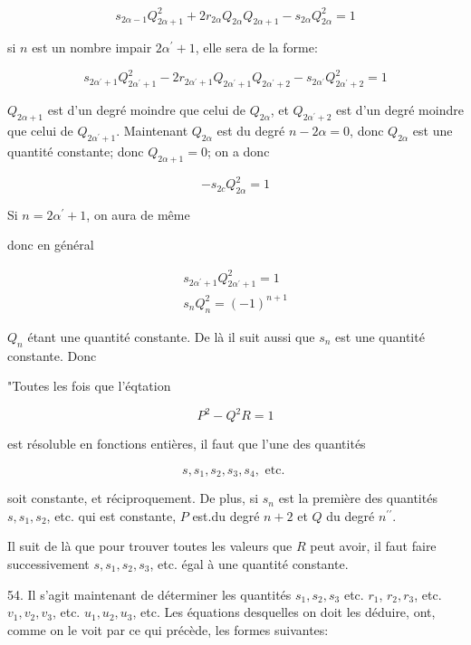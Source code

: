\documentclass{article}
\begin{document}
\[
s_{2 \alpha-1} Q_{2 \alpha+1}^{2}+2 r_{2 \alpha} Q_{2 \alpha} Q_{2 \alpha+1}-s_{2 \alpha} Q_{2 \alpha}^{2}=1
\]

si \(n\) est un nombre impair \(2 \alpha^{\prime}+1\), elle sera de la forme:

\[
s_{2 \alpha^{\prime}+1} Q_{2 \alpha^{\prime}+1}^{2}-2 r_{2 \alpha^{\prime}+1} Q_{2 \alpha^{\prime}+1} Q_{2 \alpha^{\prime}+2}-s_{2 \alpha^{\prime}} Q_{2 \alpha^{\prime}+2}^{2}=1
\]

\(Q_{2 \alpha+1}\) est d'un degré moindre que celui de \(Q_{2 \alpha}\), et \(Q_{2 \alpha^{\prime}+2}\) est d'un degré moindre que celui de \(Q_{2 \alpha^{\prime}+1}\). Maintenant \(Q_{2 \alpha}\) est du degré \(n-2 \alpha=0\), donc \(Q_{2 \alpha}\) est une quantité constante; donc \(Q_{2 \alpha+1}=0\); on a donc

\[
-s_{2 c} Q_{2 \alpha}^{2}=1
\]

Si \(n=2 \alpha^{\prime}+1\), on aura de même

donc en général

\[
\begin{gathered}
s_{2 \alpha^{\prime}+1} Q_{2 \alpha^{\prime}+1}^{2}=1 \\
s_{n} Q_{n}^{2}=(-1)^{n+1}
\end{gathered}
\]

\(Q_{n}\) étant une quantité constante. De là il suit aussi que \(s_{n}\) est une quantité constante. Donc

"Toutes les fois que l'éqtation

\[
P^{2}-Q^{2} R=1
\]

est résoluble en fonctions entières, il faut que l'une des quantités

\[
s, s_{1}, s_{2}, s_{3}, s_{4}, \text { etc. }
\]

soit constante, et réciproquement. De plus, si \(s_{n}\) est la première des quantités \(s, s_{1}, s_{2}\), etc. qui est constante, \(P\) est.du degré \(n+2\) et \(Q\) du degré \(n^{\prime \prime}\).

Il suit de là que pour trouver toutes les valeurs que \(R\) peut avoir, il faut faire successivement \(s, s_{1}, s_{2}, s_{3}\), etc. égal à une quantité constante.

54. Il s'agit maintenant de déterminer les quantités \(s_{1}, s_{2}, s_{3}\) etc. \(r_{1}\), \(r_{2}, r_{3}\), etc. \(v_{1}, v_{2}, v_{3}\), etc. \(u_{1}, u_{2}, u_{3}\), etc. Les équations desquelles on doit les déduire, ont, comme on le voit par ce qui précède, les formes suivantes:
\end{document}
